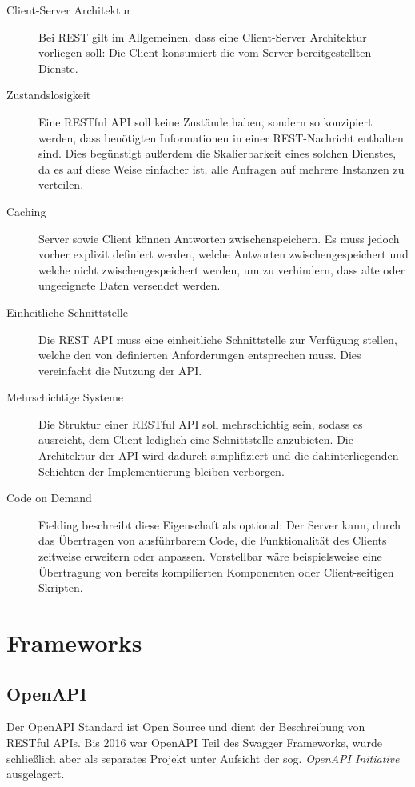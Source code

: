 		\begin{description}
			\item[Client-Server Architektur] 
				Bei \ac{REST} gilt im Allgemeinen, dass eine Client-Server Architektur vorliegen soll: Die Client konsumiert die vom Server bereitgestellten Dienste. 
			\item[Zustandslosigkeit] 
				Eine RESTful \ac{API} soll keine Zustände haben, sondern so konzipiert werden, dass benötigten Informationen in einer REST-Nachricht enthalten sind. Dies begünstigt außerdem die Skalierbarkeit eines solchen Dienstes, da es auf diese Weise einfacher ist, alle Anfragen auf mehrere Instanzen zu verteilen.
			\item[Caching] 
				Server sowie Client können Antworten zwischenspeichern. Es muss jedoch vorher explizit definiert werden, welche Antworten zwischengespeichert und welche nicht zwischengespeichert werden, um zu verhindern, dass alte oder ungeeignete Daten versendet werden.
			\item[Einheitliche Schnittstelle]
				Die \ac{REST} \ac{API} muss eine einheitliche Schnittstelle zur Verfügung stellen, welche den von \cite{RoyThomasFielding.2000} definierten Anforderungen entsprechen muss. Dies vereinfacht die Nutzung der \ac{API}.
			\item[Mehrschichtige Systeme]
				 Die Struktur einer RESTful \ac{API} soll mehrschichtig sein, sodass es ausreicht, dem Client lediglich eine Schnittstelle anzubieten. Die Architektur der API wird dadurch simplifiziert und die dahinterliegenden Schichten der Implementierung bleiben verborgen.
			\item[Code on Demand] 
				Fielding beschreibt diese Eigenschaft als optional: Der Server kann, durch das Übertragen von ausführbarem Code, die Funktionalität des Clients zeitweise erweitern oder anpassen. Vorstellbar wäre beispielsweise eine Übertragung von bereits kompilierten Komponenten oder Client-seitigen Skripten. 
				
		\end{description}

	\section{Frameworks}
	
		\subsection{OpenAPI} %
		
			Der OpenAPI Standard ist Open Source und dient der Beschreibung von RESTful APIs. Bis 2016 war OpenAPI Teil des Swagger Frameworks, wurde schließlich aber als separates Projekt unter Aufsicht der sog. \textit{OpenAPI Initiative}  ausgelagert. 
			
